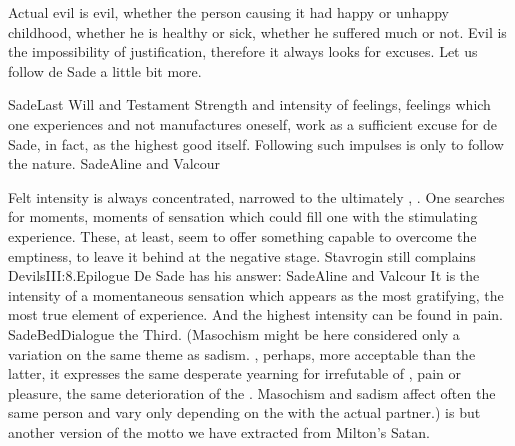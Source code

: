 Actual evil is evil, whether the person causing it had happy or unhappy
childhood, whether he is healthy or sick, whether he suffered much or not. Evil
is the impossibility of justification, therefore it always looks
for excuses. Let us follow de Sade a little bit more. 

\pa \citet{Certain souls seem hard because they are capable of strong feelings,
  and they sometimes go to rather extreme lengths; their apparent unconcern and
  cruelty are but ways, known only to themselves, of feeling more strongly than
  others.}{Sade}{Last Will and Testament} Strength and intensity of feelings,
  feelings which one 
experiences and not manufactures oneself, work as a sufficient excuse for de
Sade, in fact, as the highest good itself.  Following such impulses is only to
follow the nature.  \citet{We are no guiltier in following the primitive
  impulses that govern us than is the Nile for her floods or the sea for her
  waves.}{Sade}{Aline and Valcour\label{cit:Nile}}

Felt intensity is always concentrated, narrowed to the ultimately ,
. One searches for moments, moments of sensation which could fill
one with the stimulating experience. These, at least, seem to offer something
capable to overcome the emptiness, to leave it behind at the negative stage.
Stavrogin still complains \citet{Here I liked to live least. But even here I was
  unable to hate anything. [...] I may desire to make a good act and it causes
  me pleasure. But just in a moment I desire an evil one and feel equal
  pleasure. Both this and that feeling is as always too flat, and I never desire
  strongly.}{Devils}{III:8.Epilogue} De Sade has his answer: \citet{True
  felicity lies only in the senses, and virtue gratifies none of
  them.}{Sade}{Aline and Valcour} It is the intensity of a momentaneous
sensation which appears 
as the most gratifying, the most true element of experience.
And the highest intensity can be found in pain.  \citet{[W]e are much more
  keenly affected by pain than by pleasure: reverberations which result in us
  when the sensation of pain is produced in others will essentially be of a more
  vigorous character, more incisive, will more energetically resound in us [...]
  hence pain must be preferred, for pain's telling effects cannot deceive, and
  its vibrations are more powerful.}{SadeBed}{Dialogue the Third. 
  (Masochism might be
  here considered only a variation on the same theme as sadism.
, perhaps, more acceptable than the latter, it expresses the same
  desperate yearning for irrefutable  of , pain or
  pleasure, the same deterioration of the . Masochism and sadism affect
  often the same person and vary only depending on the  with
  the actual partner.) }   is but another version of the motto we have extracted from Milton's
Satan.

